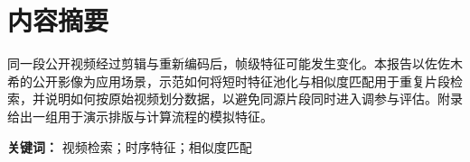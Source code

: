 {\chapter*{内\quad 容\quad 摘\quad 要}}

同一段公开视频经过剪辑与重新编码后，帧级特征可能发生变化。本报告以佐佐木希的公开影像为应用场景，示范如何将短时特征池化与相似度匹配用于重复片段检索，并说明如何按原始视频划分数据，以避免同源片段同时进入调参与评估。附录给出一组用于演示排版与计算流程的模拟特征。

\medskip
\noindent\textbf{关键词：} 视频检索；时序特征；相似度匹配
